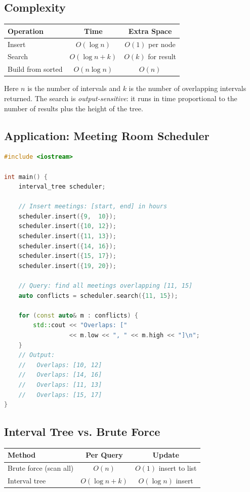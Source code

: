 \subsection{Complexity}

\begin{center}
\begin{tabular}{lcc}
\toprule
Operation & Time & Extra Space \\
\midrule
Insert & $O(\log n)$ & $O(1)$ per node \\
Search & $O(\log n + k)$ & $O(k)$ for result \\
Build from sorted & $O(n \log n)$ & $O(n)$ \\
\bottomrule
\end{tabular}
\end{center}

Here $n$ is the number of intervals and $k$ is the number of overlapping intervals returned. The search is \emph{output-sensitive}: it runs in time proportional to the number of results plus the height of the tree.

\subsection{Application: Meeting Room Scheduler}

\begin{lstlisting}[language=C++]
#include <iostream>

int main() {
    interval_tree scheduler;

    // Insert meetings: [start, end] in hours
    scheduler.insert({9,  10});
    scheduler.insert({10, 12});
    scheduler.insert({11, 13});
    scheduler.insert({14, 16});
    scheduler.insert({15, 17});
    scheduler.insert({19, 20});

    // Query: find all meetings overlapping [11, 15]
    auto conflicts = scheduler.search({11, 15});

    for (const auto& m : conflicts) {
        std::cout << "Overlaps: ["
                  << m.low << ", " << m.high << "]\n";
    }
    // Output:
    //   Overlaps: [10, 12]
    //   Overlaps: [14, 16]
    //   Overlaps: [11, 13]
    //   Overlaps: [15, 17]
}
\end{lstlisting}

\subsection{Interval Tree vs. Brute Force}

\begin{center}
\begin{tabular}{lcc}
\toprule
Method & Per Query & Update \\
\midrule
Brute force (scan all) & $O(n)$ & $O(1)$ insert to list \\
Interval tree & $O(\log n + k)$ & $O(\log n)$ insert \\
\bottomrule
\end{tabular}
\end{center}

